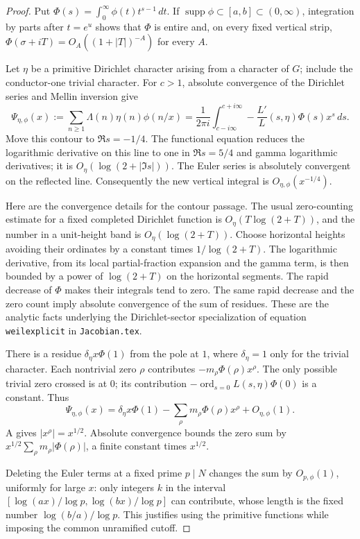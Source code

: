 \begin{proof}
Put $\Phi(s)=\int_0^\infty\phi(t)t^{s-1}\,dt$.  If
$\operatorname{supp}\phi\subset[a,b]\subset(0,\infty)$, integration
by parts after $t=e^u$ shows that $\Phi$ is entire and, on every fixed
vertical strip, $\Phi(\sigma+iT)=O_A((1+|T|)^{-A})$ for every $A$.

Let $\eta$ be a primitive Dirichlet character arising from a character
of $G$; include the conductor-one trivial character.  For $c>1$,
absolute convergence of the Dirichlet series and Mellin inversion give
\[
 \Psi_{\eta,\phi}(x):=\sum_{n\geq1}\Lambda(n)\eta(n)\phi(n/x)
 =\frac1{2\pi i}\int_{c-i\infty}^{c+i\infty}
       -\frac{L'}{L}(s,\eta)\Phi(s)x^s\,ds.
\]
Move this contour to $\Re s=-1/4$.  The functional equation reduces
the logarithmic derivative on this line to one in $\Re s=5/4$ and
gamma logarithmic derivatives; it is
$O_\eta(\log(2+|\Im s|))$.  The Euler series is absolutely convergent
on the reflected line.  Consequently the new vertical integral is
$O_{\eta,\phi}(x^{-1/4})$.

Here are the convergence details for the contour passage.  The usual
zero-counting estimate for a fixed completed Dirichlet function is
$O_\eta(T\log(2+T))$, and the number in a unit-height band is
$O_\eta(\log(2+T))$.  Choose horizontal heights avoiding their
ordinates by a constant times $1/\log(2+T)$.  The logarithmic
derivative, from its local partial-fraction expansion and the gamma
term, is then bounded by a power of $\log(2+T)$ on the horizontal
segments.  The rapid decrease of $\Phi$ makes their integrals tend to
zero.  The same rapid decrease and the zero count imply absolute
convergence of the sum of residues.  These are the analytic facts
underlying the Dirichlet-sector specialization of equation
\texttt{weilexplicit} in \texttt{Jacobian.tex}.

There is a residue
$\delta_\eta x\Phi(1)$ from the pole at $1$, where
$\delta_\eta=1$ only for the trivial character.  Each nontrivial zero
$\rho$ contributes $-m_\rho\Phi(\rho)x^\rho$.  The only possible
trivial zero crossed is at $0$; its contribution
$-\operatorname{ord}_{s=0}L(s,\eta)\Phi(0)$ is a constant.  Thus
\[
 \Psi_{\eta,\phi}(x)
 =\delta_\eta x\Phi(1)
   -\sum_{\rho}m_\rho\Phi(\rho)x^\rho
   +O_{\eta,\phi}(1).
\]
A gives $|x^\rho|=x^{1/2}$.  Absolute convergence bounds the zero sum
by $x^{1/2}\sum_\rho m_\rho|\Phi(\rho)|$, a finite constant times
$x^{1/2}$.

Deleting the Euler terms at a fixed prime $p\mid N$ changes the sum
by $O_{p,\phi}(1)$, uniformly for large $x$: only integers $k$ in the
interval
$[\log(ax)/\log p,\log(bx)/\log p]$ can contribute, whose length is
the fixed number $\log(b/a)/\log p$.  This justifies using the
primitive functions while imposing the common unramified cutoff.


\end{proof}
